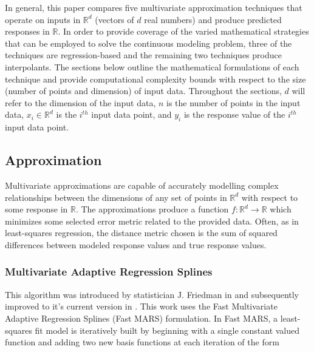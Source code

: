 \documentclass{scspaperproc}
\theoremstyle{scsthe}
\begin{document}


In general, this paper compares five multivariate approximation
techniques that operate on inputs in $\mathbb{R}^d$ (vectors of $d$
real numbers) and produce predicted responses in $\mathbb{R}$. In
order to provide coverage of the varied mathematical strategies that
can be employed to solve the continuous modeling problem, three of the
techniques are regression-based and the remaining two techniques
produce interpolants. The sections below outline the mathematical
formulations of each technique and provide computational complexity
bounds with respect to the size (number of points and dimension) of
input data. Throughout the sections, $d$ will refer to the dimension
of the input data, $n$ is the number of points in the input data,
$x_i \in \mathbb{R}^d$ is the $i^{th}$ input data point, and $y_i$ is
the response value of the $i^{th}$ input data point.

\subsection{Approximation}
Multivariate approximations are capable of accurately modelling
complex relationships between the dimensions of any set of points in
$\mathbb{R}^d$ with respect to some response in $\mathbb{R}$. The
approximations produce a function $f: \mathbb{R}^d \rightarrow
\mathbb{R}$ which minimizes some selected error metric related to the
provided data. Often, as in least-squares regression, the distance
metric chosen is the sum of squared differences between modeled
response values and true response values.

\subsubsection{Multivariate Adaptive Regression Splines}
This algorithm was introduced by statistician J. Friedman in
\cite{friedman1991multivariate} and subsequently improved to it's
current version in \cite{stanford1993fast}. This work uses the Fast
Multivariate Adaptive Regression Splines (Fast MARS) formulation. In
Fast MARS, a least-squares fit model is iteratively built by beginning
with a single constant valued function and adding two new basis
functions at each iteration of the form
\end{document}
